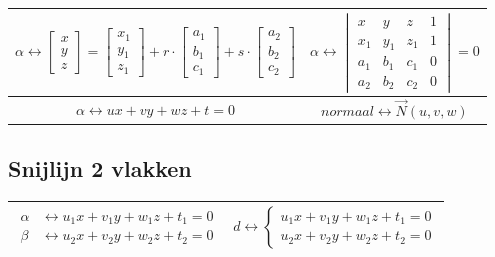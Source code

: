 \documentclass[a5paper]{article}
\begin{document}
\begin{table}[h!]
\centering
\begin{tabular}{|c|c|}
\hline
{\small $
\alpha \leftrightarrow
\begin{bmatrix}
x \\[3pt]
y \\[3pt]
z
\end{bmatrix}
=
\begin{bmatrix}
x_1 \\[3pt]
y_1 \\[3pt]
z_1
\end{bmatrix}
+ r \cdot
\begin{bmatrix}
a_1 \\[3pt]
b_1 \\[3pt]
c_1
\end{bmatrix}
+ s \cdot
\begin{bmatrix}
a_2 \\[3pt]
b_2 \\[3pt]
c_2
\end{bmatrix}
$}
&
$
\alpha \leftrightarrow
\begin{vmatrix}
x & y & z & 1 \\[3pt]
x_1 & y_1 & z_1 & 1 \\[3pt]
a_1 & b_1 & c_1 & 0 \\[3pt]
a_2 & b_2 & c_2 & 0
\end{vmatrix}
= 0
$ \\
\hline
$\alpha \leftrightarrow ux+vy+wz+t = 0 $ & $normaal \leftrightarrow \vec{N}(u, v, w)$ \\
\hline
\end{tabular}
\end{table}

\subsection{Snijlijn 2 vlakken}

\begin{table}[h!]
\centering
\begin{tabular}{|c|c|}
\hline
$
\begin{aligned}
\alpha &\leftrightarrow u_1x + v_1y + w_1z + t_1 = 0 \\
\beta  &\leftrightarrow u_2x + v_2y + w_2z + t_2 = 0
\end{aligned}
$
&
$
d \leftrightarrow 
\begin{cases}
u_1x + v_1y + w_1z + t_1 = 0 \\
u_2x + v_2y + w_2z + t_2 = 0
\end{cases}
$ \\
\hline
\end{tabular}
\end{table}
\end{document}
